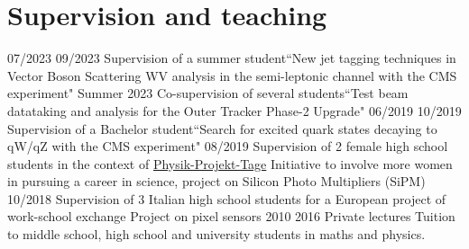 \section{Supervision and teaching}


  \teaching
    {07/2023 \textemdash{} 09/2023}
    {Supervision of a summer student}{``New jet tagging techniques in Vector Boson Scattering WV analysis in the semi-leptonic channel with the CMS experiment"}
    \teaching
    {Summer 2023}
    {Co-supervision of several students}{``Test beam datataking and analysis for the Outer Tracker Phase-2 Upgrade"}
  \teaching
    {06/2019 \textemdash{} 10/2019}
    {Supervision of a Bachelor student}{``Search for excited quark states decaying to qW/qZ with the CMS experiment"}
  \teaching
    {08/2019}
    {Supervision of 2 female high school students in the context of \href{https://www.ppt.uni-hamburg.de}{Physik-Projekt-Tage}}
    {Initiative to involve more women in pursuing a career in science, project on Silicon Photo Multipliers (SiPM)}
  \teaching
    {10/2018}
    {Supervision of 3 Italian high school students for a European project of work-school exchange}
    {Project on pixel sensors}
  \teaching
    {2010 \textemdash{} 2016}
    {Private lectures}
    {Tuition to middle school, high school and university students in maths and physics.}

